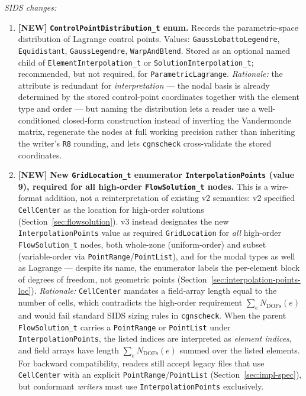 \documentclass[11pt,letterpaper]{article}
\newcommand{\NEW}{\textcolor{newgreen}{\textbf{[NEW]}}}
\begin{document}
{\vspace{0.4em}
\noindent\textit{SIDS changes:}
\begin{enumerate}[nosep,leftmargin=1.5em]
  \item \NEW{} \textbf{\texttt{ControlPointDistribution\_t} enum.}
    Records the parametric-space distribution of Lagrange control points.
    Values: \texttt{GaussLobattoLegendre}, \texttt{Equidistant},
    \texttt{GaussLegendre}, \texttt{WarpAndBlend}.
    Stored as an optional named child of \texttt{ElementInterpolation\_t}
    or \texttt{SolutionInterpolation\_t}; recommended, but not required, for
    \texttt{ParametricLagrange}.
    \textit{Rationale:} the attribute is redundant for \emph{interpretation}
    --- the nodal basis is already determined by the stored control-point
    coordinates together with the element type and order --- but naming the
    distribution lets a reader use a well-conditioned closed-form
    construction instead of inverting the Vandermonde matrix, regenerate the
    nodes at full working precision rather than inheriting the writer's
    \texttt{R8} rounding, and lets \texttt{cgnscheck} cross-validate the
    stored coordinates.

  \item \NEW{} \textbf{New \texttt{GridLocation\_t} enumerator \texttt{InterpolationPoints}
    (value 9), required for all high-order \texttt{FlowSolution\_t} nodes.}
    This is a wire-format addition, not a reinterpretation of existing v2 semantics:
    v2 specified \texttt{CellCenter} as the location for high-order solutions
    (Section~\ref{sec:flowsolution}).  v3 instead designates the new
    \texttt{InterpolationPoints} value as required \texttt{GridLocation} for
    \emph{all} high-order \texttt{FlowSolution\_t} nodes, both whole-zone
    (uniform-order) and subset (variable-order via \texttt{PointRange}/\texttt{PointList}),
    and for the modal types as well as Lagrange --- despite its name, the
    enumerator labels the per-element block of degrees of freedom, not geometric
    points (Section~\ref{sec:interpolation-points-loc}).
    \textit{Rationale:} \texttt{CellCenter} mandates a field-array length equal
    to the number of cells, which contradicts the high-order requirement
    $\sum_e N_\mathrm{DOFs}(e)$ and would fail standard SIDS sizing rules
    in \texttt{cgnscheck}.  When the parent \texttt{FlowSolution\_t} carries
    a \texttt{PointRange} or \texttt{PointList} under
    \texttt{InterpolationPoints}, the listed indices are interpreted as
    \emph{element indices}, and field arrays have length
    $\sum_e N_\mathrm{DOFs}(e)$ summed over the listed elements.  For
    backward compatibility, readers still accept legacy files that use
    \texttt{CellCenter} with an explicit \texttt{PointRange}/\texttt{PointList}
    (Section~\ref{sec:impl-spec}), but conformant \emph{writers} must use
    \texttt{InterpolationPoints} exclusively.


\end{enumerate}}
\end{document}
